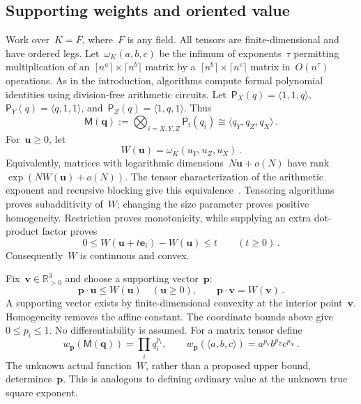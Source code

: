 \documentclass[11pt,letterpaper]{article}
\theoremstyle{definition}
\numberwithin{equation}{section}
\newcommand{\MM}{\mathsf M}
\begin{document}
\subsection{Supporting weights and oriented value}\label{sec:oriented-value}
Work over~$K=\overline F$, where~$F$ is any field. All tensors are finite-dimensional and have ordered legs. Let~$\omega_K(a,b,c)$ be the infimum of exponents~$\tau$ permitting multiplication of an~$\lceil n^a\rceil\times\lceil n^b\rceil$ matrix by a~$\lceil n^b\rceil\times\lceil n^c\rceil$ matrix in~$O(n^\tau)$ operations. As in the introduction, algorithms compute formal polynomial identities using division-free arithmetic circuits. Let~$\mathsf P_X(q)=\langle1,1,q\rangle$, $\mathsf P_Y(q)=\langle q,1,1\rangle$, and~$\mathsf P_Z(q)=\langle1,q,1\rangle$. Thus
\begin{equation}\label{rect:eq:matrix}
 \MM(\mathbf q):=\bigotimes_{i=X,Y,Z}\mathsf P_i(q_i)
 \cong\langle q_Y,q_Z,q_X\rangle\,.
\end{equation}
For~$\mathbf u\geq0$, let
\begin{equation}\label{rect:eq:W}
 W(\mathbf u)=\omega_K(u_Y,u_Z,u_X)\,.
\end{equation}
Equivalently, matrices with logarithmic dimensions~$N\mathbf u+o(N)$ have rank~$\exp(NW(\mathbf u)+o(N))$. The tensor characterization of the arithmetic exponent and recursive blocking give this equivalence~\cite{BCS97}. Tensoring algorithms proves subadditivity of~$W$; changing the size parameter proves positive homogeneity. Restriction proves monotonicity, while supplying an extra dot-product factor proves
\begin{equation*}
 0\leq W(\mathbf u+t\mathbf e_i)-W(\mathbf u)\leq t
 \qquad(t\geq0)\,.
\end{equation*}
Consequently~$W$ is continuous and convex.

Fix~$\mathbf v\in\mathbb R_{>0}^3$ and choose a supporting vector~$\mathbf p$:
\begin{equation}\label{rect:eq:support}
 \mathbf p\cdot\mathbf u\leq W(\mathbf u)\quad(\mathbf u\geq0),
 \qquad \mathbf p\cdot\mathbf v=W(\mathbf v)\,.
\end{equation}
A supporting vector exists by finite-dimensional convexity at the interior point~$\mathbf v$. Homogeneity removes the affine constant. The coordinate bounds above give~$0\leq p_i\leq1$. No differentiability is assumed. For a matrix tensor define
\begin{equation}\label{rect:eq:weight}
 w_{\mathbf p}(\MM(\mathbf q))=\prod_iq_i^{p_i},
 \qquad
 w_{\mathbf p}(\langle a,b,c\rangle)=a^{p_Y}b^{p_Z}c^{p_X}\,.
\end{equation}
The unknown actual function~$W$, rather than a proposed upper bound, determines~$\mathbf p$. This is analogous to defining ordinary value at the unknown true square exponent.
\end{document}

